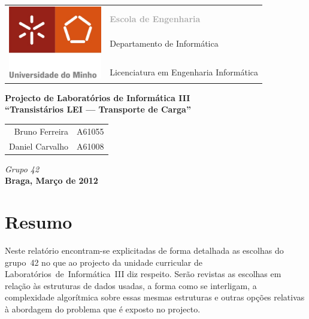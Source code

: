 \documentclass[a5paper,twocolumn, 11pt]{article}
\begin{document}
\onecolumn
\thispagestyle{empty}
\begin{tabular}{ll}
    \multirow{7}{*}{ \includegraphics[height=90pt]{logo.jpeg} }
    &\\
    & \textcolor{DarkGray}{\Large{\textbf{Escola de Engenharia}}} \\
    &\\
    & \large{Departamento de Informática}\\
    &\\
    &\\
    & \large{Licenciatura em Engenharia Informática}\\
\end{tabular}
\begin{center}
    \Large{\textbf{Projecto de Laboratórios de Informática III}}\\
    \vspace{20pt}
    \Large{\textbf{``Transistários LEI --- Transporte de Carga''}}\\
    \vspace{15pt}
    \begin{tabular}{r@{, }l}
        Bruno Ferreira&A61055\\
        Daniel Carvalho&A61008\\
    \end{tabular}
    
    \vspace{5pt}
    \emph{Grupo 42}\\\vspace{15pt}
    \large{\textbf{Braga, Março de 2012}}
\end{center}

\newpage
\twocolumn
\tableofcontents
\newpage
\listoffigures

\newpage
\section{Resumo}
Neste relatório encontram-se explicitadas de forma detalhada as escolhas do \mbox{grupo 42} no que ao projecto da unidade curricular de \mbox{Laboratórios de Informática III} diz respeito. Serão revistas as escolhas em relação às estruturas de dados usadas, a forma como se interligam, a complexidade algorítmica sobre essas mesmas estruturas e outras opções relativas à abordagem do problema que é exposto no projecto.
\end{document}
